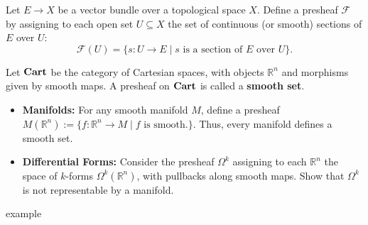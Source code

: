 \begin{example}
Let $E \to X$ be a vector bundle over a topological space $X$. Define a presheaf $\mathcal{F}$ by assigning to each open set $U \subseteq X$ the set of continuous (or smooth) sections of $E$ over $U$:
\[
\mathcal{F}(U) = \{ s : U \to E \mid s \text{ is a section of } E \text{ over } U \}.
\]
\end{example}

\begin{example}
Let $\mathbf{Cart}$ be the category of Cartesian spaces, with objects $\mathbb{R}^n$ and morphisms given by smooth maps. A presheaf on $\mathbf{Cart}$ is called a \textbf{smooth set}.
\begin{itemize}
  \item \textbf{Manifolds:} For any smooth manifold $M$, define a presheaf $M(\mathbb{R}^n) := \{f: \mathbb{R}^n\to M \mid f \text{ is smooth.}\}$. Thus, every manifold defines a smooth set.
    \item \textbf{Differential Forms:} Consider the presheaf $\Omega^k$ assigning to each $\mathbb{R}^n$ the space of $k$-forms $\Omega^k(\mathbb{R}^n)$, with pullbacks along smooth maps. Show that $\Omega^k$ is not representable by a manifold.
\end{itemize}
\end{example}

\begin{example}
  example
\end{example}

